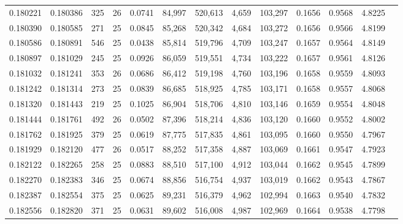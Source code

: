 \begin{tabular}{rrrrrrrrrrrrr}
0.180221 & 0.180386 &   325 &  26 &                                     0.0741 &  84,997 & 520,613 &   4,659 & 103,297 & 0.1656 & 0.9568 & 4.8225 \\
0.180390 & 0.180585 &   271 &  25 &                                     0.0845 &  85,268 & 520,342 &   4,684 & 103,272 & 0.1656 & 0.9566 & 4.8199 \\
0.180586 & 0.180891 &   546 &  25 &                                     0.0438 &  85,814 & 519,796 &   4,709 & 103,247 & 0.1657 & 0.9564 & 4.8149 \\
0.180897 & 0.181029 &   245 &  25 &                                     0.0926 &  86,059 & 519,551 &   4,734 & 103,222 & 0.1657 & 0.9561 & 4.8126 \\
0.181032 & 0.181241 &   353 &  26 &                                     0.0686 &  86,412 & 519,198 &   4,760 & 103,196 & 0.1658 & 0.9559 & 4.8093 \\
0.181242 & 0.181314 &   273 &  25 &                                     0.0839 &  86,685 & 518,925 &   4,785 & 103,171 & 0.1658 & 0.9557 & 4.8068 \\
0.181320 & 0.181443 &   219 &  25 &                                     0.1025 &  86,904 & 518,706 &   4,810 & 103,146 & 0.1659 & 0.9554 & 4.8048 \\
0.181444 & 0.181761 &   492 &  26 &                                     0.0502 &  87,396 & 518,214 &   4,836 & 103,120 & 0.1660 & 0.9552 & 4.8002 \\
0.181762 & 0.181925 &   379 &  25 &                                     0.0619 &  87,775 & 517,835 &   4,861 & 103,095 & 0.1660 & 0.9550 & 4.7967 \\
0.181929 & 0.182120 &   477 &  26 &                                     0.0517 &  88,252 & 517,358 &   4,887 & 103,069 & 0.1661 & 0.9547 & 4.7923 \\
0.182122 & 0.182265 &   258 &  25 &                                     0.0883 &  88,510 & 517,100 &   4,912 & 103,044 & 0.1662 & 0.9545 & 4.7899 \\
0.182270 & 0.182383 &   346 &  25 &                                     0.0674 &  88,856 & 516,754 &   4,937 & 103,019 & 0.1662 & 0.9543 & 4.7867 \\
0.182387 & 0.182554 &   375 &  25 &                                     0.0625 &  89,231 & 516,379 &   4,962 & 102,994 & 0.1663 & 0.9540 & 4.7832 \\
0.182556 & 0.182820 &   371 &  25 &                                     0.0631 &  89,602 & 516,008 &   4,987 & 102,969 & 0.1664 & 0.9538 & 4.7798 \\

\end{tabular}
